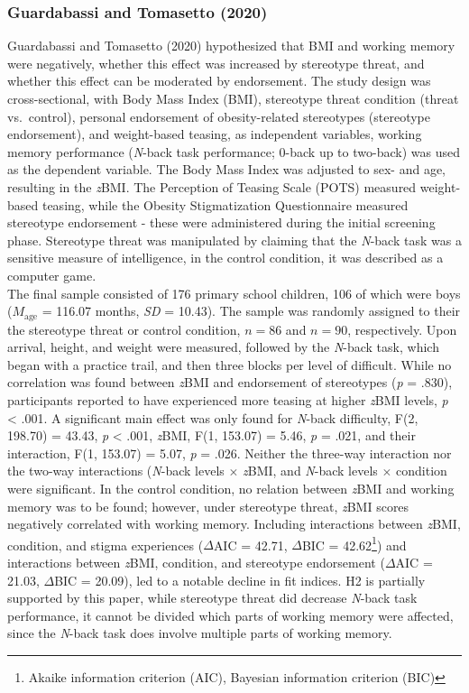 \documentclass[
  stu,floatsintext]{apa7}
\begin{document}
\subsubsection{Guardabassi and Tomasetto (2020)}\label{guardabassiweightstatusweight2020}

Guardabassi and Tomasetto (2020) hypothesized that BMI and working memory were negatively, whether this effect was increased by stereotype threat, and whether this effect can be moderated by endorsement.
The study design was cross-sectional, with Body Mass Index (BMI), stereotype threat condition (threat vs.~control), personal endorsement of obesity-related stereotypes (stereotype endorsement), and weight-based teasing, as independent variables, working memory performance (\emph{N}-back task performance; 0-back up to two-back) was used as the dependent variable.
The Body Mass Index was adjusted to sex- and age, resulting in the \emph{z}BMI.
The Perception of Teasing Scale (POTS) measured weight-based teasing, while the Obesity Stigmatization Questionnaire measured stereotype endorsement - these were administered during the initial screening phase.
Stereotype threat was manipulated by claiming that the \emph{N}-back task was a sensitive measure of intelligence, in the control condition, it was described as a computer game.\\
The final sample consisted of 176 primary school children, 106 of which were boys (\(M_{\text{age}}\) = 116.07 months, \emph{SD} = 10.43).
The sample was randomly assigned to their the stereotype threat or control condition, \(n = 86\) and \(n = 90\), respectively.
Upon arrival, height, and weight were measured, followed by the \emph{N}-back task, which began with a practice trail, and then three blocks per level of difficult.
While no correlation was found between \emph{z}BMI and endorsement of stereotypes (\emph{p} = .830), participants reported to have experienced more teasing at higher \emph{z}BMI levels, \emph{p} \textless{} .001.
A significant main effect was only found for \emph{N}-back difficulty, F(2, 198.70) = 43.43, \emph{p} \textless{} .001, \emph{z}BMI, F(1, 153.07) = 5.46, \emph{p} = .021, and their interaction, F(1, 153.07) = 5.07, \emph{p} = .026.
Neither the three-way interaction nor the two-way interactions (\emph{N}-back levels \(\times\) \emph{z}BMI, and \emph{N}-back levels \(\times\) condition were significant.
In the control condition, no relation between \emph{z}BMI and working memory was to be found; however, under stereotype threat, \emph{z}BMI scores negatively correlated with working memory.
Including interactions between \emph{z}BMI, condition, and stigma experiences (\(\Delta\)AIC = 42.71, \(\Delta\)BIC = 42.62\footnote{Akaike information criterion (AIC), Bayesian information criterion (BIC)}) and interactions between \emph{z}BMI, condition, and stereotype endorsement (\(\Delta\)AIC = 21.03, \(\Delta\)BIC = 20.09), led to a notable decline in fit indices.
H2 is partially supported by this paper, while stereotype threat did decrease \emph{N}-back task performance, it cannot be divided which parts of working memory were affected, since the \emph{N}-back task does involve multiple parts of working memory.
\end{document}
